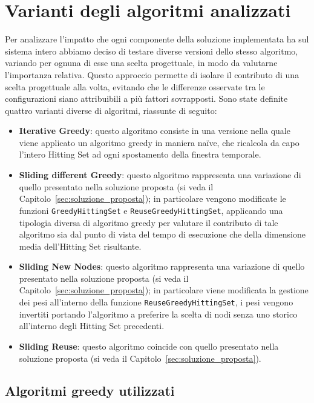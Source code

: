 
\section{Varianti degli algoritmi analizzati}\label{sec:varianti_degli_algoritmi_analizzati}

Per analizzare l'impatto che ogni componente della soluzione implementata ha sul sistema intero abbiamo deciso di testare diverse versioni dello stesso algoritmo, variando per ognuna di esse una scelta progettuale, in modo da valutarne l'importanza relativa.
Questo approccio permette di isolare il contributo di una scelta progettuale alla volta, evitando che le differenze osservate tra le configurazioni siano attribuibili a più fattori sovrapposti.
Sono state definite quattro varianti diverse di algoritmi, riassunte di seguito:
\begin{itemize}
    \item \textbf{Iterative Greedy}: questo algoritmo consiste in una versione nella quale viene applicato un algoritmo greedy in maniera naïve, che ricalcola da capo l'intero Hitting Set ad ogni spostamento della finestra temporale.
    \item \textbf{Sliding different Greedy}: questo algoritmo rappresenta una variazione di quello presentato nella soluzione proposta (si veda il Capitolo~\ref{sec:soluzione_proposta}); in particolare vengono modificate le funzioni \texttt{GreedyHittingSet} e \texttt{ReuseGreedyHittingSet}, applicando una tipologia diversa di algoritmo greedy per valutare il contributo di tale algoritmo sia dal punto di vista del tempo di esecuzione che della dimensione media dell'Hitting Set risultante.
    \item \textbf{Sliding New Nodes}: questo algoritmo rappresenta una variazione di quello presentato nella soluzione proposta (si veda il Capitolo~\ref{sec:soluzione_proposta}); in particolare viene modificata la gestione dei pesi all'interno della funzione \texttt{ReuseGreedyHittingSet}, i pesi vengono invertiti portando l'algoritmo a preferire la scelta di nodi senza uno storico all'interno degli Hitting Set precedenti.
    \item \textbf{Sliding Reuse}: questo algoritmo coincide con quello presentato nella soluzione proposta (si veda il Capitolo~\ref{sec:soluzione_proposta}).
\end{itemize}

\subsection*{Algoritmi greedy utilizzati}

